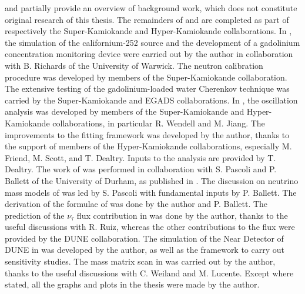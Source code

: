  and partially  provide an overview of background work, %
which does not constitute original research of this thesis.
The remainders of  and  are completed %
as part of respectively the Super-Kamiokande and Hyper-Kamiokande collaborations.
In , the simulation of the californium-252 source and the development %
of a gadolinium concentration monitoring device were carried out by the author in collaboration with %
B. Richards of the University of Warwick.
The neutron calibration procedure was developed by members of the Super-Kamiokande collaboration. 
The extensive testing of the gadolinium-loaded water Cherenkov technique was carried by the Super-Kamiokande and EGADS collaborations.
In , the oscillation analysis was developed by members of the Super-Kamiokande and Hyper-Kamiokande collaborations, %
in particular R. Wendell and M. Jiang.
The improvements to the fitting framework was developed by the author, thanks to the support of members of the Hyper-Kamiokande collaborations, %
especially M. Friend, M. Scott, and T. Dealtry.
Inputs to the analysis are provided by T. Dealtry.
The work of  was performed in collaboration with %
S. Pascoli and P. Ballett of the University of Durham, as published in .
The discussion on neutrino mass models of  was led by S. Pascoli with %
fundamental inputs by P. Ballett.
The derivation of the formulae of  was done by the author and P. Ballett.
The prediction of the $\nu_\tau$ flux contribution in  was done by the author, %
thanks to the useful discussions with R. Ruiz, %
whereas the other contributions to the flux were provided by the DUNE collaboration.
The simulation of the Near Detector of DUNE in  was developed by the author, %
as well as the framework to carry out sensitivity studies.
The mass matrix scan in  was carried out by the author, thanks to the %
useful discussions with C. Weiland and M. Lucente.
Except where stated, all the graphs and plots in the thesis were made by the author.
